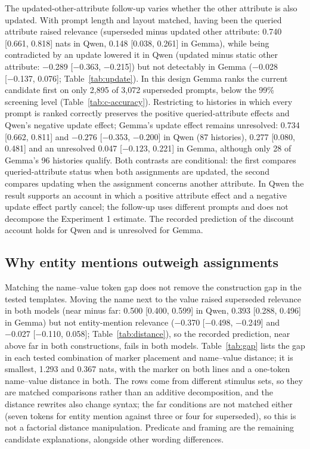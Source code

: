 The updated-other-attribute follow-up varies whether the other attribute is also updated. With prompt length and layout matched, having been the queried attribute raised relevance (superseded minus updated other attribute: 0.740 [0.661, 0.818] nats in Qwen, 0.148 [0.038, 0.261] in Gemma), while being contradicted by an update lowered it in Qwen (updated minus static other attribute: −0.289 [−0.363, −0.215]) but not detectably in Gemma (−0.028 [−0.137, 0.076]; Table~\ref{tab:update}). In this design Gemma ranks the current candidate first on only 2,895 of 3,072 superseded prompts, below the 99\% screening level (Table~\ref{tab:c-accuracy}). Restricting to histories in which every prompt is ranked correctly preserves the positive queried-attribute effects and Qwen's negative update effect; Gemma's update effect remains unresolved: 0.734 [0.662, 0.811] and $-0.276$ [$-0.353$, $-0.200$] in Qwen (87 histories), 0.277 [0.080, 0.481] and an unresolved 0.047 [$-0.123$, 0.221] in Gemma, although only 28 of Gemma's 96 histories qualify. Both contrasts are conditional: the first compares queried-attribute status when both assignments are updated, the second compares updating when the assignment concerns another attribute. In Qwen the result supports an account in which a positive attribute effect and a negative update effect partly cancel; the follow-up uses different prompts and does not decompose the Experiment 1 estimate. The recorded prediction of the discount account holds for Qwen and is unresolved for Gemma.

\subsection{Why entity mentions outweigh assignments}
\label{sec:entity-gap}

Matching the name--value token gap does not remove the construction gap in the tested templates. Moving the name next to the value raised superseded relevance in both models (near minus far: 0.500 [0.400, 0.599] in Qwen, 0.393 [0.288, 0.496] in Gemma) but not entity-mention relevance (−0.370 [−0.498, −0.249] and −0.027 [−0.110, 0.058]; Table~\ref{tab:distance}), so the recorded prediction, near above far in both constructions, fails in both models. Table~\ref{tab:gap} lists the gap in each tested combination of marker placement and name--value distance; it is smallest, 1.293 and 0.367 nats, with the marker on both lines and a one-token name--value distance in both. The rows come from different stimulus sets, so they are matched comparisons rather than an additive decomposition, and the distance rewrites also change syntax; the far conditions are not matched either (seven tokens for entity mention against three or four for superseded), so this is not a factorial distance manipulation. Predicate and framing are the remaining candidate explanations, alongside other wording differences.

